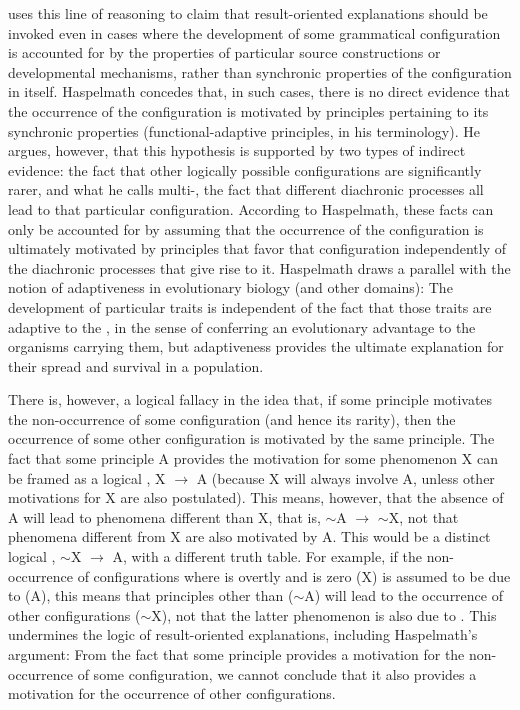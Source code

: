 \documentclass[output=paper]{langsci/langscibook}
\begin{document}
 uses this line of reasoning to claim that
result-oriented explanations  should be invoked even in cases where
the development of some grammatical configuration is accounted
for by the properties of particular source constructions or developmental
mechanisms, rather than synchronic properties of the configuration in itself.  Haspelmath concedes that, in such cases,
there is no direct evidence that the occurrence of the
configuration is motivated by principles pertaining to its synchronic
properties (functional-adaptive principles, in his terminology). He argues, however, that this
hypothesis is supported by two types of indirect evidence: the fact
that other logically possible configurations are significantly rarer, and what he calls
multi-, the fact that different  diachronic processes all
lead to that particular configuration. According to Haspelmath, these facts
can only be accounted for by assuming that the occurrence of
the configuration is ultimately motivated by
principles that favor that configuration independently of the
diachronic processes that give rise to it.
 Haspelmath draws a parallel with the notion
of adaptiveness in evolutionary biology (and other domains):
The development of particular traits is independent of the fact that
those traits are adaptive to the , in the sense of conferring an evolutionary advantage to the organisms
carrying them, but adaptiveness provides the ultimate explanation for their
spread and survival in a population.

There is, however, a logical fallacy in the idea that, if some
 principle motivates the  non-occurrence of some
configuration (and hence its rarity),
then the occurrence of some other configuration is motivated by the
same principle. The fact that some principle A provides the motivation
for some phenomenon X can be framed as a logical ,  X
$\rightarrow$ A (because X will always involve A, unless other
motivations for X are also postulated).  This
 means, however, that the absence of A will lead to phenomena different
than X, that is, $\sim$A $\rightarrow$ $\sim$X, not that phenomena
different from X are also motivated by A. This would be a distinct logical
, $\sim$X $\rightarrow$ A, with a different truth table.
For example, if the non-occurrence
of configurations where  is
overtly  and  is zero  (X)  is assumed to be due to
 (A), this means that principles other than  ($\sim$A) will lead to the occurrence of other configurations ($\sim$X), not that
the latter phenomenon is also due to . This undermines the 
logic of result-oriented explanations, including Haspelmath's
argument: From the fact that some principle provides 
a motivation for the non-occurrence of some
configuration, we cannot conclude that it also provides a
motivation for the occurrence of other configurations.
\end{document}
